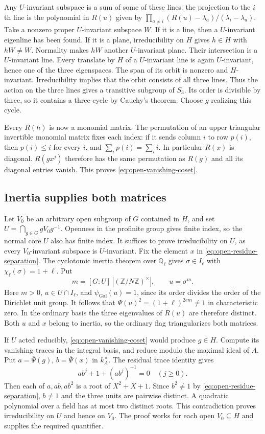 Any $U$-invariant subspace is a sum of some of these lines: the
projection to the $i$th line is the polynomial in $R(u)$ given by
$\prod_{a\ne i}(R(u)-\lambda_a)/(\lambda_i-\lambda_a)$.
Take a nonzero proper $U$-invariant subspace $W$. If it is a line,
then a $U$-invariant eigenline has been found. If it is a plane,
irreducibility on $H$ gives $h\in H$ with $hW\ne W$.
Normality makes $hW$ another $U$-invariant plane. Their intersection
is a $U$-invariant line. Every translate by $H$ of a $U$-invariant
line is again $U$-invariant, hence one of the three eigenspaces.
The span of its orbit is nonzero and $H$-invariant. Irreducibility
implies that the orbit consists of all three lines. Thus the action
on the three lines gives a transitive subgroup of $S_3$.
Its order is divisible by three, so it contains a three-cycle
by Cauchy's theorem. Choose $g$ realizing this cycle.

Every $R(h)$ is now a monomial matrix. The permutation of an upper
triangular invertible monomial matrix fixes each index: if it sends
column $i$ to row $p(i)$, then $p(i)\le i$ for every $i$, and
$\sum_i p(i)=\sum_i i$. In particular $R(x)$ is diagonal.
$R(gx^j)$ therefore has the same permutation as $R(g)$ and all its
diagonal entries vanish. This proves \eqref{eq:open-vanishing-coset}.

\subsection{Inertia supplies both matrices}

Let $V_0$ be an arbitrary open subgroup of $G$ contained in $H$,
and set $U=\bigcap_{g\in G}gV_0g^{-1}$. Openness in the profinite
group gives finite index, so the normal core $U$ also has finite
index. It suffices to prove irreducibility on $U$, as every
$V_0$-invariant subspace is $U$-invariant. Fix the element $x$ in
\eqref{eq:open-residue-separation}. The cyclotomic inertia theorem
over $\mathbb Q_\ell$ gives $\sigma\in I_\ell$ with
$\chi_\ell(\sigma)=1+\ell$. Put
\[
    m=[G:U]\, |(\mathbb Z/N\mathbb Z)^\times|,\qquad u=\sigma^m .
\]
Here $m>0$, $u\in U\cap I_\ell$, and $\psi_{\mathrm{Gal}}(u)=1$,
since its order divides the order of the Dirichlet unit group.
It follows that $\Psi(u)^2=(1+\ell)^{2em}\ne1$ in characteristic
zero. In the ordinary basis the three eigenvalues of $R(u)$ are
therefore distinct. Both $u$ and $x$ belong to inertia, so the
ordinary flag triangularizes both matrices.

If $U$ acted reducibly, \eqref{eq:open-vanishing-coset} would produce
$g\in H$. Compute its vanishing traces in the integral basis, and
reduce modulo the maximal ideal of $A$. Put $a=\overline\Psi(g)$,
$b=\overline\Psi(x)$ in $k_A^\times$. The residual trace identity
gives
\[
                 ab^j+1+(ab^j)^{-1}=0\quad(j\ge0).
\]
Then each of $a,ab,ab^2$ is a root of $X^2+X+1$.
Since $b^2\ne1$ by \eqref{eq:open-residue-separation}, $b\ne1$
and the three units are pairwise distinct. A quadratic polynomial
over a field has at most two distinct roots. This contradiction proves
irreducibility on $U$ and hence on $V_0$. The proof works for each
open $V_0\subseteq H$ and supplies the required quantifier.

